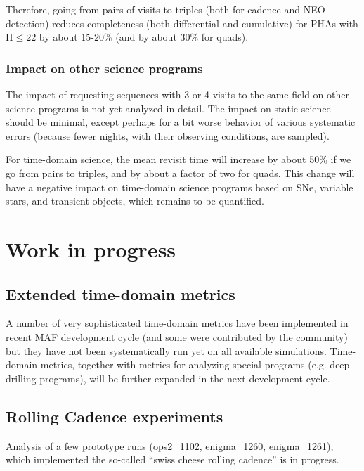 \documentclass[manuscript]{article}
\begin{document}
Therefore, going from pairs of visits to triples (both for cadence and NEO detection) 
reduces completeness (both differential and cumulative) for PHAs with H$\le$22 by 
about 15-20\% (and by about 30\% for quads).



\subsubsection{Impact on other science programs}

The impact of requesting sequences with 3 or 4 visits to the same field on other 
science programs is not yet analyzed in detail.  The impact on static science should be 
minimal, except perhaps for a bit worse behavior of various systematic errors (because
fewer nights, with their observing conditions, are sampled). 

For time-domain science, the mean revisit time will increase by about 50\% if we go 
from pairs to triples, and by about a factor of two for quads. This change will have a 
negative impact on time-domain science programs based on SNe, variable stars, and
transient objects, which remains to be quantified. 


\newpage
\section{Work in progress} 



\subsection{Extended time-domain metrics}

A number of very sophisticated time-domain metrics have been implemented in recent 
MAF development cycle (and some were contributed by the community) but they have not 
been systematically run yet on all available simulations. Time-domain metrics, together
with metrics for analyzing special programs (e.g. deep drilling programs), will be further 
expanded in the next development cycle. 


\subsection{Rolling Cadence experiments} 

Analysis of a few prototype runs (ops2\_1102, enigma\_1260, enigma\_1261), which 
implemented the so-called ``swiss cheese rolling cadence'' is in progress.
\end{document}
